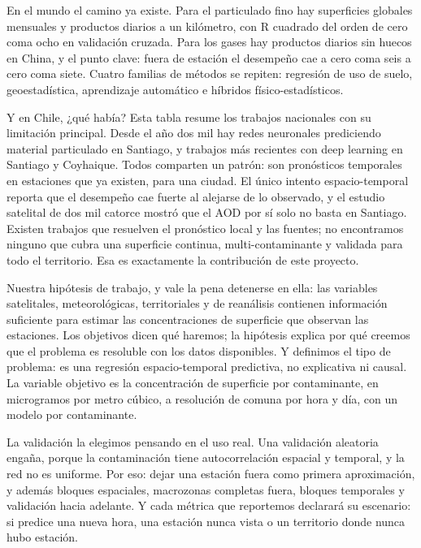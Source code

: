 En el mundo el camino ya existe. Para el particulado fino hay superficies globales mensuales y productos diarios a un kilómetro, con R cuadrado del orden de cero coma ocho en validación cruzada. Para los gases hay productos diarios sin huecos en China, y el punto clave: fuera de estación el desempeño cae a cero coma seis a cero coma siete. Cuatro familias de métodos se repiten: regresión de uso de suelo, geoestadística, aprendizaje automático e híbridos físico-estadísticos.

Y en Chile, ¿qué había? Esta tabla resume los trabajos nacionales con su limitación principal.  Desde el año dos mil hay redes neuronales prediciendo material particulado en Santiago, y trabajos más recientes con deep learning en Santiago y Coyhaique. Todos comparten un patrón: son pronósticos temporales en estaciones que ya existen, para una ciudad. El único intento espacio-temporal reporta que el desempeño cae fuerte al alejarse de lo observado, y el estudio satelital de dos mil catorce mostró que el AOD por sí solo no basta en Santiago. Existen trabajos que resuelven el pronóstico local y las fuentes; no encontramos ninguno que cubra una superficie continua, multi-contaminante y validada para todo el territorio. Esa es exactamente la contribución de este proyecto.

Nuestra hipótesis de trabajo, y vale la pena detenerse en ella: las variables satelitales, meteorológicas, territoriales y de reanálisis contienen información suficiente para estimar las concentraciones de superficie que observan las estaciones. Los objetivos dicen qué haremos; la hipótesis explica por qué creemos que el problema es resoluble con los datos disponibles. Y definimos el tipo de problema: es una regresión espacio-temporal predictiva, no explicativa ni causal. La variable objetivo es la concentración de superficie por contaminante, en microgramos por metro cúbico, a resolución de comuna por hora y día, con un modelo por contaminante.

La validación la elegimos pensando en el uso real. Una validación aleatoria engaña, porque la contaminación tiene autocorrelación espacial y temporal, y la red no es uniforme. Por eso: dejar una estación fuera como primera aproximación, y además bloques espaciales, macrozonas completas fuera, bloques temporales y validación hacia adelante. Y cada métrica que reportemos declarará su escenario: si predice una nueva hora, una estación nunca vista o un territorio donde nunca hubo estación.

